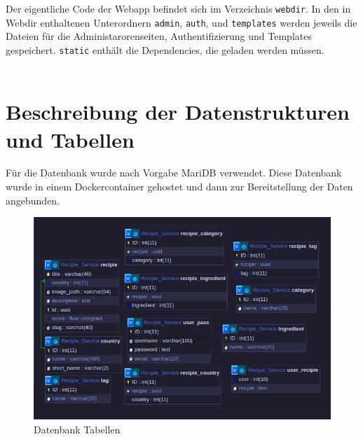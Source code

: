 \documentclass{article}
\begin{document}
Der eigentliche Code der Webapp befindet sich im Verzeichnis \verb|webdir|. 
In den in Webdir enthaltenen Unterordnern \verb|admin|, \verb|auth|, und \verb|templates| werden 
jeweils die Dateien für die Administarorenseiten, Authentifizierung und Templates gespeichert.
\verb|static| enthält die Dependencies, die geladen werden müssen.
\\
\\



\pagebreak
\section{Beschreibung der Datenstrukturen \newline und Tabellen}

Für die Datenbank wurde nach Vorgabe MariDB verwendet. Diese Datenbank wurde in einem Dockercontainer gehostet und dann zur Bereitstellung der Daten angebunden.

\begin{figure}[!hbt]
    \centering
    \includegraphics[scale=0.75, width=\textwidth]{Pictures/DB_Tables2.png}
    \caption{Datenbank Tabellen}
    \label{fig:sfig1}
\end{figure}
\end{document}
